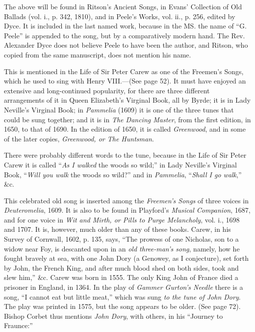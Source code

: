 The above will be found in Ritson’s Ancient Songs, in Evans’ Collection of Old
Ballads (vol. i., p. 342, 1810), and in Peele’s Works, vol. ii., p. 256, edited by
Dyce. It is included in the last named work, because in the MS. the name of
“G. Peele” is appended to the song, but by a comparatively modern hand. The
Rev. Alexander Dyce does not believe Peele to have been the author, and Ritson,
who copied from the same manuscript, does not mention his name.


This is mentioned in the Life of Sir Peter Carew as one of the Freemen’s Songs,
which he used to sing with Henry VIII.—(See page 52). It must have enjoyed
an extensive and long-continued popularity, for there are three different arrangements
of it in Queen Elizabeth’s Virginal Book, all by Byrde; it is in Lady
Neville’s Virginal Book; in \textit{Pammelia} (1609) it is one of the three tunes that
could be sung together; and it is in \textit{The Dancing Master}, from the first edition,
in 1650, to that of 1690. In the edition of 1650, it is called \textit{Greenwood}, and in
some of the later copies, \textit{Greenwood, or The Huntsman}.

There were probably different words to the tune, because in the Life of Sir
Peter Carew it is called “\textit{As I walked} the woods so wild;” in Lady Neville’s
Virginal Book, “\textit{Will you walk} the woods so wild?” and in \textit{Pammelia}, “\textit{Shall
I go walk},” \&c.

\smallskip


\pagebreak


This celebrated old song is inserted among the \textit{Freemen’s Songs} of three voices
in \textit{Deuteromelia}, 1609. It is also to be found in Playford’s \textit{Musical Companion},
1687, and for one voice in \textit{Wit and Mirth, or Pills to Purge Melancholy}, vol. i.,
1698 and 1707. It is, however, much older than any of these books. Carew,
in his Survey of Cornwall, 1602, p. 135, says, “The prowess of one Nicholas,
son to a widow near Foy, is descanted upon in an \textit{old three-man's song}, namely,
how he fought bravely at sea, with one John Dory (a Genowey, as I conjecture),
set forth by John, the French King, and after much blood shed on both sides, took
and slew him,” \&c. Carew was born in 1555. The only King John of France
died a prisoner in England, in 1364. In the play of \textit{Gammer Gurton's Needle}
there is a song, “I cannot eat but little meat,” which was sung \textit{to the tune of
John Dory}. The play was printed in 1575, but the song appears to be older.
(See page 72). Bishop Corbet thus mentions \textit{John Dory}, with others, in his
“Journey to Fraunce:”

